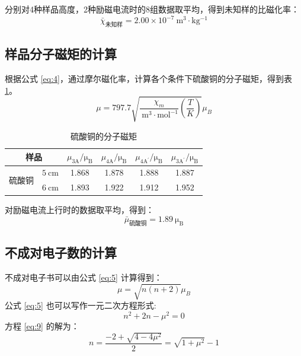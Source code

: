 \documentclass[cn,hazy,pku,12pt,normal,math=newtx,cite=super]{elegantnote}
\begin{document}
分别对4种样品高度，2种励磁电流时的8组数据取平均，得到未知样的比磁化率：
\begin{equation*}
    \bar{\chi}_{\text{未知样}} = 2.00\times 10^{-7} \mathrm{~m^3\cdot kg^{-1}}
\end{equation*}

\subsection{样品分子磁矩的计算}

根据公式 \eqref{eq:4}，通过摩尔磁化率，计算各个条件下硫酸铜的分子磁矩，得到表 \ref{tab:8}。
\begin{equation}\label{eq:4}
    \mu=797.7 \sqrt{\frac{\chi_m}{\mathrm{~m}^3 \cdot \mathrm{mol}^{-1}}\left(\frac{T}{K}\right)} \mu_B 
\end{equation}

\begin{table}[H]
    \centering
    \caption{硫酸铜的分子磁矩}
    \begin{tabular}{cccccc}
        \toprule
        \multicolumn{2}{c}{样品} & $\mu_{3\mathrm{A}}/\mathrm{\mu_{B}}$ & $\mu_{4\mathrm{A}}/\mathrm{\mu_{B}}$ &  $\mu_{4\mathrm{A}^\prime}/\mathrm{\mu_{B}}$ &   $\mu_{3\mathrm{A}^\prime}/\mathrm{\mu_{B}}$ \\
        \midrule
        \multirow{2}{*}{硫酸铜} & $5 \mathrm{~cm}$ & 1.868 & 1.878 & 1.888 & 1.887  \\
        & $6 \mathrm{~cm}$ & 1.893 & 1.922 & 1.912 & 1.952  \\
        \bottomrule
    \end{tabular}
    \label{tab:8}
\end{table}

对励磁电流上行时的数据取平均，得到：
\begin{equation*}
    \bar{\mu}_{\text{硫酸铜}} = 1.89 \mathrm{~\mu_{B}}
\end{equation*}

\subsection{不成对电子数的计算}

不成对电子书可以由公式 \eqref{eq:5} 计算得到：
\begin{equation}\label{eq:5}
    \mu=\sqrt{n(n+2)} \mu_B
\end{equation}
公式 \eqref{eq:5} 也可以写作一元二次方程形式:
\begin{equation}\label{eq:9}
    n^2 +2n-\mu^2 = 0
\end{equation}
方程 \eqref{eq:9} 的解为：
\begin{equation}\label{eq:10}
    n = \frac{-2+\sqrt{4-4\mu^2}}{2} = \sqrt{1+\mu^2} - 1
\end{equation}
\end{document}
